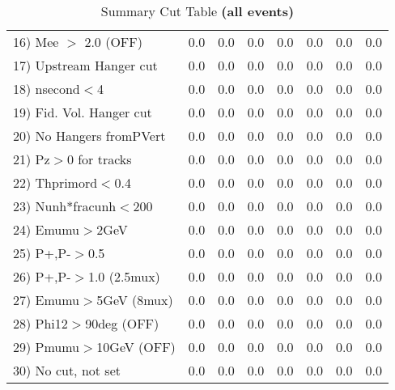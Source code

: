 \begin{table}[h!]
{{\begin{tabular}{||l||r|r|r|r|r||r||r||}
 16) Mee $>$ 2.0  (OFF)   &       0.0 &       0.0 &       0.0 &       0.0 &       0.0 &       0.0 &       0.0 \\
 17) Upstream Hanger cut  &       0.0 &       0.0 &       0.0 &       0.0 &       0.0 &       0.0 &       0.0 \\
 18) nsecond$<$4          &       0.0 &       0.0 &       0.0 &       0.0 &       0.0 &       0.0 &       0.0 \\
 19) Fid. Vol. Hanger cut &       0.0 &       0.0 &       0.0 &       0.0 &       0.0 &       0.0 &       0.0 \\
 20) No Hangers fromPVert &       0.0 &       0.0 &       0.0 &       0.0 &       0.0 &       0.0 &       0.0 \\
 21) Pz$>$0 for tracks    &       0.0 &       0.0 &       0.0 &       0.0 &       0.0 &       0.0 &       0.0 \\
 22) Thprimord$<$0.4      &       0.0 &       0.0 &       0.0 &       0.0 &       0.0 &       0.0 &       0.0 \\
 23) Nunh*fracunh$<$200   &       0.0 &       0.0 &       0.0 &       0.0 &       0.0 &       0.0 &       0.0 \\
 24) Emumu$>$2GeV         &       0.0 &       0.0 &       0.0 &       0.0 &       0.0 &       0.0 &       0.0 \\
 25) P+,P-$>$0.5          &       0.0 &       0.0 &       0.0 &       0.0 &       0.0 &       0.0 &       0.0 \\
 26) P+,P-$>$1.0 (2.5mux) &       0.0 &       0.0 &       0.0 &       0.0 &       0.0 &       0.0 &       0.0 \\
 27) Emumu$>$5GeV  (8mux) &       0.0 &       0.0 &       0.0 &       0.0 &       0.0 &       0.0 &       0.0 \\
 28) Phi12$>$90deg  (OFF) &       0.0 &       0.0 &       0.0 &       0.0 &       0.0 &       0.0 &       0.0 \\
 29) Pmumu$>$10GeV  (OFF) &       0.0 &       0.0 &       0.0 &       0.0 &       0.0 &       0.0 &       0.0 \\
 30) No cut, not set      &       0.0 &       0.0 &       0.0 &       0.0 &       0.0 &       0.0 &       0.0 \\
 \hline
 \hline
 \end{tabular}
 \caption{Summary Cut Table \textbf{ (all events)}}
 \label{tab-sumcut}
 }}
 \end{table}
 \endinput
